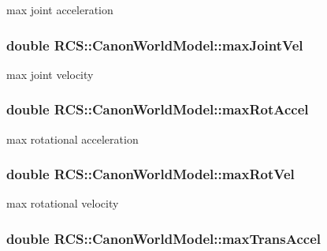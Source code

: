 max joint acceleration \hypertarget{structRCS_1_1CanonWorldModel_a29c9099062e430196fc659fd7ae2f8ef}{
\subsubsection[{max\-Joint\-Vel}]{\setlength{\rightskip}{0pt plus 5cm}double R\-C\-S\-::\-Canon\-World\-Model\-::max\-Joint\-Vel}}\label{structRCS_1_1CanonWorldModel_a29c9099062e430196fc659fd7ae2f8ef}
max joint velocity \hypertarget{structRCS_1_1CanonWorldModel_aca5f8ebce128e94ed4edf3caabb6c363}{
\subsubsection[{max\-Rot\-Accel}]{\setlength{\rightskip}{0pt plus 5cm}double R\-C\-S\-::\-Canon\-World\-Model\-::max\-Rot\-Accel}}\label{structRCS_1_1CanonWorldModel_aca5f8ebce128e94ed4edf3caabb6c363}
max rotational acceleration \hypertarget{structRCS_1_1CanonWorldModel_acbb472eee22bb4764dc865476fe56950}{
\subsubsection[{max\-Rot\-Vel}]{\setlength{\rightskip}{0pt plus 5cm}double R\-C\-S\-::\-Canon\-World\-Model\-::max\-Rot\-Vel}}\label{structRCS_1_1CanonWorldModel_acbb472eee22bb4764dc865476fe56950}
max rotational velocity \hypertarget{structRCS_1_1CanonWorldModel_a9b6d5469341e73289788ba0fe0f3c57a}{
\subsubsection[{max\-Trans\-Accel}]{\setlength{\rightskip}{0pt plus 5cm}double R\-C\-S\-::\-Canon\-World\-Model\-::max\-Trans\-Accel}}\label{structRCS_1_1CanonWorldModel_a9b6d5469341e73289788ba0fe0f3c57a}
